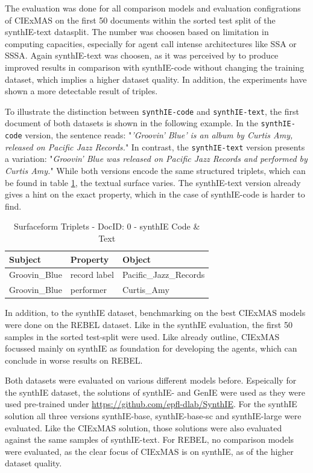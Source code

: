 \documentclass[a4paper,oneside,bibliography=totoc]{scrbook}
\begin{document}
The evaluation was done for all comparison models and evaluation configrations of CIExMAS on the first 50 documents within the sorted test split of the synthIE-text datasplit. The number was choosen based on limitation in computing capacities, especially for agent call intense architectures like \ac{SSA} or \ac{SSSA}. Again synthIE-text was choosen, as it was perceived by \citet{Josifoski2023} to produce improved results in comparison with synthIE-code without changing the training dataset, which implies a higher dataset quality. In addition, the experiments have shown a more detectable result of triples.

To illustrate the distinction between \texttt{synthIE-code} and \texttt{synthIE-text}, the first document of both datasets is shown in the following example. In the \texttt{synthIE-code} version, the sentence reads: "\emph{'Groovin' Blue' is an album by Curtis Amy, released on Pacific Jazz Records.}" In contrast, the \texttt{synthIE-text} version presents a variation: "\emph{Groovin' Blue was released on Pacific Jazz Records and performed by Curtis Amy.}" While both versions encode the same structured triplets, which can be found in table \ref{tab:triple-example}, the textual surface varies. The synthIE-text version already gives a hint on the exact property, which in the case of synthIE-code is harder to find.

\begin{table}[h]
  \centering
  \begin{tabular}{l l l}
    \toprule
    \textbf{Subject} & \textbf{Property} & \textbf{Object}        \\
    \midrule
    Groovin\_Blue    & record label      & Pacific\_Jazz\_Records \\
    Groovin\_Blue    & performer         & Curtis\_Amy            \\
    \bottomrule
  \end{tabular}
  \caption{Surfaceform Triplets - DocID: 0 - synthIE Code \& Text}
  \label{tab:triple-example}
\end{table}

In addition, to the synthIE dataset, benchmarking on the best CIExMAS models were done on the REBEL dataset. Like in the synthIE evaluation, the first 50 samples in the sorted test-split were used. Like already outline, CIExMAS focussed mainly on synthIE as foundation for developing the agents, which can conclude in worse results on REBEL.

Both datasets were evaluated on various different models before. Espeically for the synthIE dataset, the solutions of \citet{Josifoski2023} synthIE- and GenIE were used as they were used pre-trained under \url{https://github.com/epfl-dlab/SynthIE}. For the synthIE solution all three versions synthIE-base, synthIE-base-sc and synthIE-large were evaluated. Like the CIExMAS solution, those solutions were also evaluated against the same samples of synthIE-text. For REBEL, no comparison models were evaluated, as the clear focus of CIExMAS is on synthIE, as of the higher dataset quality.
\end{document}
